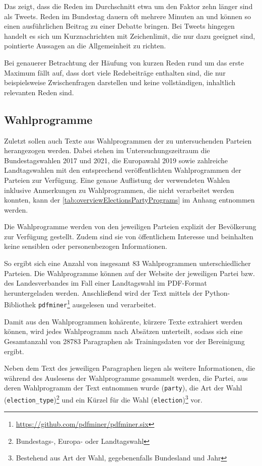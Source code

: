 Das zeigt, dass die Reden im Durchschnitt etwa um den Faktor zehn länger sind als Tweets. Reden im Bundestag dauern oft mehrere Minuten an und können so einen ausführlichen Beitrag zu einer Debatte bringen. Bei Tweets hingegen handelt es sich um Kurznachrichten mit Zeichenlimit, die nur dazu geeignet sind, pointierte Aussagen an die Allgemeinheit zu richten.

Bei genauerer Betrachtung der Häufung von kurzen Reden rund um das erste Maximum fällt auf, dass dort viele Redebeiträge enthalten sind, die nur beispielsweise Zwischenfragen darstellen und keine vollständigen, inhaltlich relevanten Reden sind.

\subsection*{Wahlprogramme}

Zuletzt sollen auch Texte aus Wahlprogrammen der zu untersuchenden Parteien herangezogen werden. Dabei stehen im Untersuchungszeitraum die Bundestagswahlen \num{2017} und \num{2021}, die Europawahl 2019 sowie zahlreiche Landtagswahlen mit den entsprechend veröffentlichten Wahlprogrammen der Parteien zur Verfügung. Eine genaue Auflistung der verwendeten Wahlen inklusive Anmerkungen zu Wahlprogrammen, die nicht verarbeitet werden konnten, kann der \autoref{tab:overviewElectionsPartyPrograms} im Anhang entnommen werden.

Die Wahlprogramme werden von den jeweiligen Parteien explizit der Bevölkerung zur Verfügung gestellt. Zudem sind sie von öffentlichem Interesse und beinhalten keine sensiblen oder personenbezogen Informationen.

So ergibt sich eine Anzahl von insgesamt \num{83} Wahlprogrammen unterschiedlicher Parteien. Die Wahlprogramme können auf der Website der jeweiligen Partei bzw. des Landesverbandes im Fall einer Landtagswahl im \ac{PDF}-Format heruntergeladen werden. Anschließend wird der Text mittels der Python-Bibliothek \texttt{pdfminer}\footnote{\href{https://github.com/pdfminer/pdfminer.six}{https://github.com/pdfminer/pdfminer.six}} ausgelesen und verarbeitet.

Damit aus den Wahlprogrammen kohärente, kürzere Texte extrahiert werden können, wird jedes Wahlprogramm nach Absätzen unterteilt, sodass sich eine Gesamtanzahl von \num{28783} Paragraphen als Trainingsdaten vor der Bereinigung ergibt.

Neben dem Text des jeweiligen Paragraphen liegen als weitere Informationen, die während des Auslesens der Wahlprogramme gesammelt werden, die Partei, aus deren Wahlprogramm der Text entnommen wurde (\texttt{party}), die Art der Wahl (\texttt{election\_type})\footnote{Bundestags-, Europa- oder Landtagswahl} und ein Kürzel für die Wahl (\texttt{election})\footnote{Bestehend aus Art der Wahl, gegebenenfalls Bundesland und Jahr} vor.

